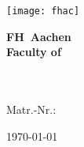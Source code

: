 \begin{titlepage}

	\thispagestyle{empty}

	\begin{flushright}
		\texttt{[image: fhac]}
	\end{flushright}

	\vspace{-2.5cm}

	\centering \bfseries \Large FH~Aachen \\
	\vspace{0.5cm}
	\normalsize Faculty of\\
	\facultyName \\
	\degreeProgram

	\vspace{3cm}

	\centering \bfseries \thesisType

	\vspace{0.8cm}

	\centering \begin{minipage}[t]{17cm}
		\centering \bfseries \large \paperTopic
		\medskip
	\end{minipage}

	\vspace{1.5cm}

	\begin{minipage}[t]{9cm}
		\centering \paperAuthor \\ Matr.-Nr.: \matrNumber
	\end{minipage}

	\vspace{2.1cm}


	\vspace{7cm}


	\begin{center}
		\today
	\end{center}

	\restoregeometry
\end{titlepage}
